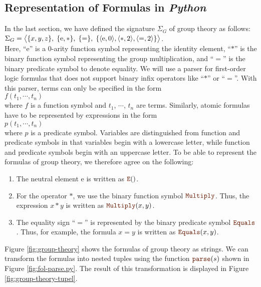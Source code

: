 \subsection{Representation of Formulas in \textsl{Python}}
In the last section, we have defined the signature $\Sigma_G$ of
group theory as follows:
\\[0.2cm]
\hspace*{1.3cm}
$\Sigma_G = 
   \bigl\langle \{x,y,z\},\; \{\mathrm{e},*\},\; \{=\},\; \{ \pair(\mathrm{e},0), \pair(*,2), \pair(=,2) \} \bigr\rangle 
$.
\\[0.2cm]
Here, ``$\mathrm{e}$'' is a 0-arity function symbol representing the identity element, ``$*$'' is
the binary function symbol representing the group multiplication, and ``$=$'' is the binary predicate symbol to 
denote equality. 
We will use a parser for first-order logic formulas that does not support binary infix operators like
``$*$'' or ``$=$''. With this parser, terms can only be specified in the form
\\[0.2cm]
\hspace*{1.3cm}
$f(t_1,\cdots,t_n)$
\\[0.2cm]
where $f$ is a function symbol and $t_1$, $\cdots$, $t_n$ are terms. Similarly, atomic formulas have to be
represented by expressions in the form 
\\[0.2cm]
\hspace*{1.3cm}
$p(t_1,\cdots,t_n)$
\\[0.2cm]
where $p$ is a predicate symbol. Variables are distinguished from function and predicate symbols
in that variables begin with a lowercase letter, while function and
predicate symbols begin with an uppercase letter. To be able to represent the formulas of group theory, we therefore agree on the following:
\begin{enumerate}
\item The neutral element $\mathrm{e}$ is written as $\mytt{E}()$.  
\item For the operator $*$, we use the binary function symbol $\mytt{Multiply}$.
      Thus, the expression $x*y$ is written as $\mytt{Multiply}(x, y)$.
\item The equality sign ``$=$'' is represented by the binary predicate symbol
      $\mytt{Equals}$. Thus, for example, the formula $x = y$ is written as $\mytt{Equals}(x, y)$.
\end{enumerate}
Figure \ref{fig:group-theory} shows the formulas of group theory as strings.
We can transform the formulas into nested tuples using the function $\mytt{parse}(s)$ shown in Figure
\ref{fig:fol-parse.py}. The result of this transformation is displayed in Figure \ref{fig:group-theory-tupel}. 


